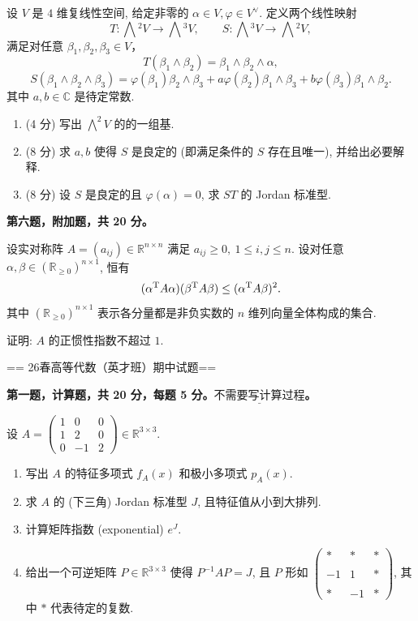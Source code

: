 设 $V$ 是 $4$ 维复线性空间, 给定非零的 $\alpha\in V,\varphi\in V^\vee$. 定义两个线性映射
\[T:\bigwedge{}^2V\to\bigwedge{}^3V,\qquad S:\bigwedge{}^3V\to\bigwedge{}^2V,\]
满足对任意 $\beta_1,\beta_2,\beta_3\in V$，
\[T(\beta_1\wedge\beta_2)=\beta_1\wedge\beta_2\wedge\alpha,\]
\[S(\beta_1\wedge\beta_2\wedge\beta_3)=\varphi(\beta_1)\beta_2\wedge\beta_3
+a\varphi(\beta_2)\beta_1\wedge\beta_3+b\varphi(\beta_3)\beta_1\wedge\beta_2.\]
其中 $a,b\in\mathbb{C}$ 是待定常数.
\begin{enumerate}
\item (4 分) 写出 $\bigwedge^2V$ 的的一组基.
\item (8 分) 求 $a,b$ 使得 $S$ 是良定的 (即满足条件的 $S$ 存在且唯一), 并给出必要解释.
\item (8 分) 设 $S$ 是良定的且 $\varphi(\alpha)=0$, 求 $ST$ 的 Jordan 标准型.
\end{enumerate}
\textbf{第六题，附加题，共 20 分。}

设实对称阵 $A=(a_{ij})\in\mathbb{R}^{n\times n}$ 满足 $a_{ij}\ge0,\ 1\le i,j\le n$. 
设对任意 $\alpha,\beta\in(\mathbb{R}_{\ge0})^{n\times1}$, 恒有
\[(\alpha^{\rm T}A\alpha)(\beta^{\rm T}A\beta)\le(\alpha^{\rm T}A\beta)^2.\]
其中 $(\mathbb{R}_{\ge0})^{n\times1}$ 表示各分量都是非负实数的 $n$ 维列向量全体构成的集合.

证明: $A$ 的正惯性指数不超过 $1$.

== 26春高等代数（英才班）期中试题==

\textbf{第一题，计算题，共 20 分，每题 5 分。$\underline{不需要写计算过程}$。}

设
\(A = \begin{pmatrix} 1 & 0 & 0 \\ 1 & 2 & 0 \\ 0 & -1 & 2 \end{pmatrix} \in \mathbb{R}^{3\times 3}\).

\begin{enumerate}
\item
  写出 $A$ 的特征多项式 \(f_{A}(x)\) 和极小多项式 \(p_{A}(x)\).
\item
  求 $A$ 的 (下三角) Jordan 标准型 $J$, 且特征值从小到大排列.
\item
  计算矩阵指数 (exponential) \(e^{J}\).
\item
  给出一个可逆矩阵 \(P \in \mathbb{R}^{3 \times 3}\) 
  使得 \(P^{-1}AP = J\), 且 \(P\) 形如
  \(\begin{pmatrix} * & * & *\\ \\-1 & 1 & *\\ \\* & -1 & * \end{pmatrix}\), 
  其中 \(*\) 代表待定的复数.
\end{enumerate}

